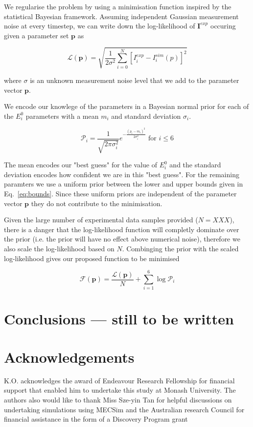 \documentclass[a4paper, 12pt]{article}
\begin{document}
We regularise the problem by using a minimisation function inspired by the
statistical Bayesian framework. Assuming independent Gaussian measurement noise
at every timestep, we can write down the log-likelihood of $\mathbf{I}^{exp}$
occuring given a parameter set $\mathbf{p}$ as

\begin{equation}
    \mathcal{L}(\mathbf{p}) = \sqrt{\frac{1}{2 \sigma^2} \sum_{i=0}^{N} [I^{exp}_i-I^{sim}_i(p)]^2}
\end{equation}

where $\sigma$ is an unknown measurement noise level that we add to the
parameter vector $\mathbf{p}$.

We encode our knowlege of the parameters in a Bayesian normal prior for each of
the $E^0_i$ parameters with a mean $m_i$ and standard deviation $\sigma_i$. 

\begin{equation}
    \mathcal{P}_i = \frac{1}{\sqrt{2 \pi \sigma_i^2}} e^{-\frac{(p_i-m_i)^2}{2 \sigma_i^2}} \text{      for } i \le 6
\end{equation}

The mean encodes our "best guess" for the value of $E^0_i$ and the standard
deviation encodes how confident we are in this "best guess". For the remaining
paramters we use a uniform prior between the lower and upper bounds given in
Eq.~\ref{eq:bounds}. Since these uniform priors are independent of the parameter vector $\mathbf{p}$ they do not contribute to the minimisation. 

Given the large number of experimental data samples provided ($N = XXX$),
there is a danger that the log-likelihood function will completly dominate over
the prior (i.e. the prior will have no effect above numerical noise), therefore
we also scale the log-likelihood based on $N$. Combinging the prior with the
scaled log-likelihood gives our proposed function to be minimised

\begin{equation}
    \mathcal{F}(\mathbf{p}) =  \frac{\mathcal{L}(\mathbf{p})}{N} + 
    \sum_{i=1}^6 \log \mathcal{P}_i
\end{equation}

\section{Conclusions --- still to be written}

\section{Acknowledgements}

K.O. acknowledges the award of Endeavour Research Fellowship for financial
support that enabled him to undertake this study at Monash University. The
authors also would like to thank Miss Sze-yin Tan for helpful discussions on
undertaking simulations using MECSim and the Australian research Council for
financial assistance in the form of a Discovery Program grant



\end{document}
